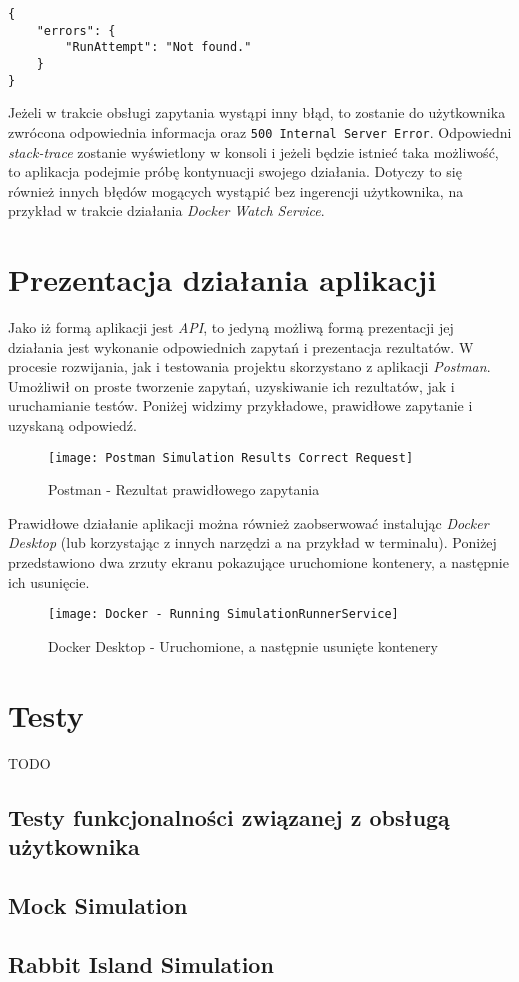 \begin{lstlisting}
{
	"errors": {
		"RunAttempt": "Not found."
	}
}
\end{lstlisting}

\par Jeżeli w trakcie obsługi zapytania wystąpi inny błąd, to zostanie do użytkownika zwrócona odpowiednia informacja oraz \texttt{500 Internal Server Error}. Odpowiedni \emph{stack-trace} zostanie wyświetlony w konsoli i jeżeli będzie istnieć taka możliwość, to aplikacja podejmie próbę kontynuacji swojego działania. Dotyczy to się również innych błędów mogących wystąpić bez ingerencji użytkownika, na przykład w trakcie działania \emph{Docker Watch Service}.

\section{Prezentacja działania aplikacji}

\par Jako iż formą aplikacji jest \emph{API}, to jedyną możliwą formą prezentacji jej działania jest wykonanie odpowiednich zapytań i prezentacja rezultatów. W procesie rozwijania, jak i testowania projektu skorzystano z aplikacji \emph{Postman}. Umożliwił on proste tworzenie zapytań, uzyskiwanie ich rezultatów, jak i uruchamianie testów. Poniżej widzimy przykładowe, prawidłowe zapytanie i uzyskaną odpowiedź.

\begin{figure}[H]
	\texttt{[image: Postman Simulation Results Correct Request]}
	\caption{Postman - Rezultat prawidłowego zapytania}
\end{figure}

\par Prawidłowe działanie aplikacji można również zaobserwować instalując \emph{Docker Desktop} (lub korzystając z innych narzędzi \emph{\docker{}}a na przykład w terminalu). Poniżej przedstawiono dwa zrzuty ekranu pokazujące uruchomione kontenery, a następnie ich usunięcie.

\begin{figure}[H]
	\texttt{[image: Docker - Running SimulationRunnerService]}
	\caption{Docker Desktop - Uruchomione, a następnie usunięte kontenery}
\end{figure}

\section{Testy}

TODO

\subsection{Testy funkcjonalności związanej z obsługą użytkownika}

\subsection{Mock Simulation}

\subsection{Rabbit Island Simulation}

